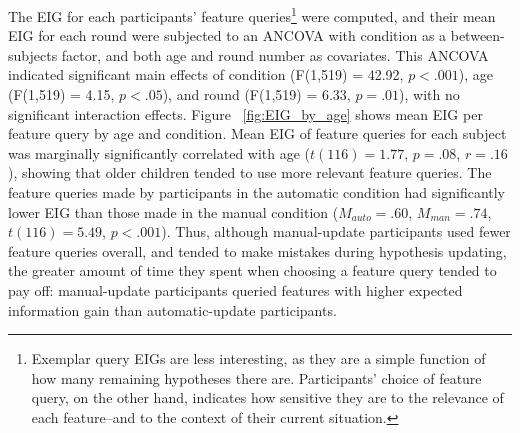 \documentclass[10pt,letterpaper]{article}
\begin{document}
The EIG for each participants' feature queries\footnote{Exemplar query EIGs are 
less interesting, as they are a simple function of how many remaining hypotheses 
there are. Participants' choice of feature query, on the other hand, indicates how 
sensitive they are to the relevance of each feature--and to the context of their 
current situation.} were computed, and their mean EIG for each round were 
subjected to an ANCOVA with condition as a between-subjects factor, and both age 
and round number as covariates. This ANCOVA indicated significant main effects of 
condition (F(1,519) = 42.92, $p<.001$), age (F(1,519) = 4.15, $p<.05$), and round 
(F(1,519) = 6.33, $p = .01$), with no significant interaction effects. Figure~
\ref{fig:EIG_by_age} shows mean EIG per feature query by age and condition. Mean 
EIG of feature queries for each subject was marginally significantly correlated with 
age ($t(116)=1.77$, $p=.08$, $r=.16$), showing that older children tended to use 
more relevant feature queries. The feature queries made by participants in the 
automatic condition had significantly lower EIG than those made in the manual 
condition ($M_{auto} = .60$, $M_{man} = .74$, $t(116) = 5.49$,  $p<.001$). Thus, 
although manual-update participants used fewer feature queries overall, and tended 
to make mistakes during hypothesis updating, the greater amount of time they spent 
when choosing a feature query tended to pay off: manual-update participants 
queried features with higher expected information gain than automatic-update 
participants. 


\end{document}
